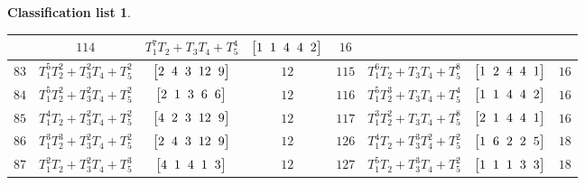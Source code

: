 \documentclass[10pt,a4paper]{amsart}
\theoremstyle{definition}
\newtheorem{class-list}[thm]{Classification list}
\numberwithin{equation}{section}
\begin{document}
\begin{class-list}
\begin{table}[t!]
\begin{tabu}{c|c|c|c||c|c|c|c}
&${114}$&${T_{1}^{7}T_{2}+T_{3}T_{4}+T_{5}^{4}}$
&$\arraycolsep=1mm\begin{bmatrix}{1} & {1} & {4} & {4} & {2}\end{bmatrix}$&${16}$
\\
\hline
${83}$&${T_{1}^{5}T_{2}^{2}+T_{3}^{2}T_{4}+T_{5}^{2}}$
&$\arraycolsep=1mm\begin{bmatrix}{2} & {4} & {3} & {12} & {9}\end{bmatrix}$&${12}$
&${115}$&${T_{1}^{6}T_{2}+T_{3}T_{4}+T_{5}^{8}}$
&$\arraycolsep=1mm\begin{bmatrix}{1} & {2} & {4} & {4} & {1}\end{bmatrix}$&${16}$
\\
\hline
${84}$&${T_{1}^{5}T_{2}^{2}+T_{3}^{2}T_{4}+T_{5}^{2}}$
&$\arraycolsep=1mm\begin{bmatrix}{2} & {1} & {3} & {6} & {6}\end{bmatrix}$&${12}$
&${116}$&${T_{1}^{5}T_{2}^{3}+T_{3}T_{4}+T_{5}^{4}}$
&$\arraycolsep=1mm\begin{bmatrix}{1} & {1} & {4} & {4} & {2}\end{bmatrix}$&${16}$
\\
\hline
${85}$&${T_{1}^{4}T_{2}+T_{3}^{2}T_{4}+T_{5}^{2}}$
&$\arraycolsep=1mm\begin{bmatrix}{4} & {2} & {3} & {12} & {9}\end{bmatrix}$&${12}$
&${117}$&${T_{1}^{3}T_{2}^{2}+T_{3}T_{4}+T_{5}^{8}}$
&$\arraycolsep=1mm\begin{bmatrix}{2} & {1} & {4} & {4} & {1}\end{bmatrix}$&${16}$
\\
\hline
${86}$&${T_{1}^{3}T_{2}^{3}+T_{3}^{2}T_{4}+T_{5}^{2}}$
&$\arraycolsep=1mm\begin{bmatrix}{2} & {4} & {3} & {12} & {9}\end{bmatrix}$&${12}$
&${126}$&${T_{1}^{4}T_{2}+T_{3}^{3}T_{4}^{2}+T_{5}^{2}}$
&$\arraycolsep=1mm\begin{bmatrix}{1} & {6} & {2} & {2} & {5}\end{bmatrix}$&${18}$
\\
\hline
${87}$&${T_{1}^{2}T_{2}+T_{3}^{2}T_{4}+T_{5}^{3}}$
&$\arraycolsep=1mm\begin{bmatrix}{4} & {1} & {4} & {1} & {3}\end{bmatrix}$&${12}$
&${127}$&${T_{1}^{5}T_{2}+T_{3}^{3}T_{4}+T_{5}^{2}}$
&$\arraycolsep=1mm\begin{bmatrix}{1} & {1} & {1} & {3} & {3}\end{bmatrix}$&${18}$
\\
\hline
\end{tabu}\vspace{-4mm}
\end{table}



\end{class-list}
\end{document}
